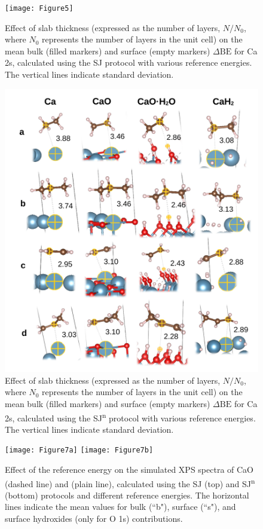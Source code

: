 \documentclass[journal=jpccck,manuscript=article]{achemso}
\def\dbe{\ensuremath{\Delta\text{BE}}}
\begin{document}
\begin{figure}[!h]
	\centering
	\texttt{[image: Figure5]}
	\caption{Effect of slab thickness (expressed as the number of layers, $N/N_0$, where $N_0$ represents the number of layers in the unit cell) on the mean bulk (filled markers) and surface (empty markers) \dbe{} for Ca 2s, calculated using the SJ protocol with various reference energies. The vertical lines indicate standard deviation.}
	\label{fig:slabsthicknessSJ}
\end{figure}

\begin{figure}[!h]
	\centering
	\includegraphics[width=.85\linewidth]{Figure6}
	\caption{Effect of slab thickness (expressed as the number of layers, $N/N_0$, where $N_0$ represents the number of layers in the unit cell) on the mean bulk (filled markers) and surface (empty markers) \dbe{} for Ca 2s, calculated using the SJ\textsuperscript{n} protocol with various reference energies. The vertical lines indicate standard deviation.}
	\label{fig:slabsthicknessSJn}
\end{figure}


\begin{figure}[!h]
	\centering
	\texttt{[image: Figure7a]}
	\texttt{[image: Figure7b]}
	\caption{Effect of the reference energy on the simulated XPS spectra of CaO (dashed line)  and  (plain line), calculated using the SJ (top) and SJ\textsuperscript{n} (bottom) protocols and different reference energies. The horizontal lines indicate the mean values for bulk (``b"), surface (``s"), and surface hydroxides (only for   O 1s) contributions.}
	\label{fig:slabOH2}
\end{figure}
\end{document}
